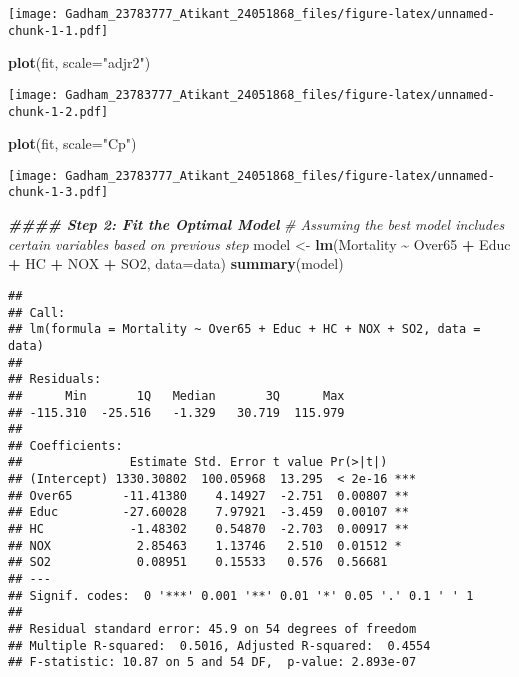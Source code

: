 \documentclass[
]{article}
\newenvironment{Shaded}{\begin{snugshade}}{\end{snugshade}}
\newcommand{\AttributeTok}[1]{\textcolor[rgb]{0.13,0.29,0.53}{#1}}
\newcommand{\CommentTok}[1]{\textcolor[rgb]{0.56,0.35,0.01}{\textit{#1}}}
\newcommand{\DocumentationTok}[1]{\textcolor[rgb]{0.56,0.35,0.01}{\textbf{\textit{#1}}}}
\newcommand{\FunctionTok}[1]{\textcolor[rgb]{0.13,0.29,0.53}{\textbf{#1}}}
\newcommand{\NormalTok}[1]{#1}
\newcommand{\OtherTok}[1]{\textcolor[rgb]{0.56,0.35,0.01}{#1}}
\newcommand{\SpecialCharTok}[1]{\textcolor[rgb]{0.81,0.36,0.00}{\textbf{#1}}}
\newcommand{\StringTok}[1]{\textcolor[rgb]{0.31,0.60,0.02}{#1}}
\begin{document}
\texttt{[image: Gadham\_23783777\_Atikant\_24051868\_files/figure-latex/unnamed-chunk-1-1.pdf]}

\begin{Shaded}
\begin{Highlighting}[]
\FunctionTok{plot}\NormalTok{(fit, }\AttributeTok{scale=}\StringTok{"adjr2"}\NormalTok{)}
\end{Highlighting}
\end{Shaded}

\texttt{[image: Gadham\_23783777\_Atikant\_24051868\_files/figure-latex/unnamed-chunk-1-2.pdf]}

\begin{Shaded}
\begin{Highlighting}[]
\FunctionTok{plot}\NormalTok{(fit, }\AttributeTok{scale=}\StringTok{"Cp"}\NormalTok{)}
\end{Highlighting}
\end{Shaded}

\texttt{[image: Gadham\_23783777\_Atikant\_24051868\_files/figure-latex/unnamed-chunk-1-3.pdf]}

\begin{Shaded}
\begin{Highlighting}[]
\DocumentationTok{\#\#\#\# Step 2: Fit the Optimal Model}
\CommentTok{\# Assuming the best model includes certain variables based on previous step}
\NormalTok{model }\OtherTok{\textless{}{-}} \FunctionTok{lm}\NormalTok{(Mortality }\SpecialCharTok{\textasciitilde{}}\NormalTok{ Over65 }\SpecialCharTok{+}\NormalTok{ Educ }\SpecialCharTok{+}\NormalTok{ HC }\SpecialCharTok{+}\NormalTok{ NOX }\SpecialCharTok{+}\NormalTok{ SO2, }\AttributeTok{data=}\NormalTok{data)}
\FunctionTok{summary}\NormalTok{(model)}
\end{Highlighting}
\end{Shaded}

\begin{verbatim}
## 
## Call:
## lm(formula = Mortality ~ Over65 + Educ + HC + NOX + SO2, data = data)
## 
## Residuals:
##      Min       1Q   Median       3Q      Max 
## -115.310  -25.516   -1.329   30.719  115.979 
## 
## Coefficients:
##               Estimate Std. Error t value Pr(>|t|)    
## (Intercept) 1330.30802  100.05968  13.295  < 2e-16 ***
## Over65       -11.41380    4.14927  -2.751  0.00807 ** 
## Educ         -27.60028    7.97921  -3.459  0.00107 ** 
## HC            -1.48302    0.54870  -2.703  0.00917 ** 
## NOX            2.85463    1.13746   2.510  0.01512 *  
## SO2            0.08951    0.15533   0.576  0.56681    
## ---
## Signif. codes:  0 '***' 0.001 '**' 0.01 '*' 0.05 '.' 0.1 ' ' 1
## 
## Residual standard error: 45.9 on 54 degrees of freedom
## Multiple R-squared:  0.5016, Adjusted R-squared:  0.4554 
## F-statistic: 10.87 on 5 and 54 DF,  p-value: 2.893e-07
\end{verbatim}
\end{document}
